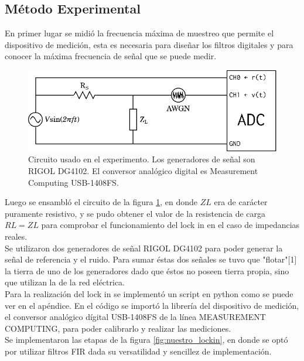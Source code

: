 \documentclass[11pt,a4paper]{extarticle}
\begin{document}
\begin{multicols}{2}
\section{Método Experimental}

En primer lugar se midió la frecuencia máxima de 
muestreo que permite el dispositivo de medición, esta es necesaria para diseñar los filtros digitales y para conocer la máxima frecuencia de señal que se puede medir.\\

\begin{figure}[H]
	\centering
	\includegraphics[width=\linewidth]{Images/circuito.eps}
	\caption{Circuito usado en el experimento. Los generadores de señal son RIGOL DG4102. El conversor analógico digital es Measurement Computing USB-1408FS.}
	\label{fig:circuito}
\end{figure}


Luego se ensambló el circuito de la figura 
\ref{fig:circuito}, en donde $ZL$ era de carácter
 puramente resistivo, y se pudo obtener 
el valor de la resistencia de carga $RL = ZL$ para 
comprobar el funcionamiento del lock in en el caso 
de impedancias reales.\\ 

Se utilizaron dos generadores de señal RIGOL DG4102 
para poder generar la señal de referencia y el ruido.
Para sumar éstas dos señales se tuvo que "flotar"[1] la 
tierra de uno de los generadores dado que éstos no poseen 
tierra propia, sino que utilizan la de la red eléctrica.\\

Para la realización del lock in se implementó un 
script en python como se puede ver en el apéndice.
En el código se importó la librería del dispositivo 
de medición, el 
conversor analógico dígital USB-1408FS de la línea 
MEASUREMENT COMPUTING, para poder 
calibrarlo y realizar las mediciones.\\

Se implementaron 
las etapas de la figura \ref{fig:nuestro_lockin},
 en donde se optó por utilizar filtros FIR dada 
 su versatilidad y sencillez de implementación.\\


\end{multicols}
\end{document}
